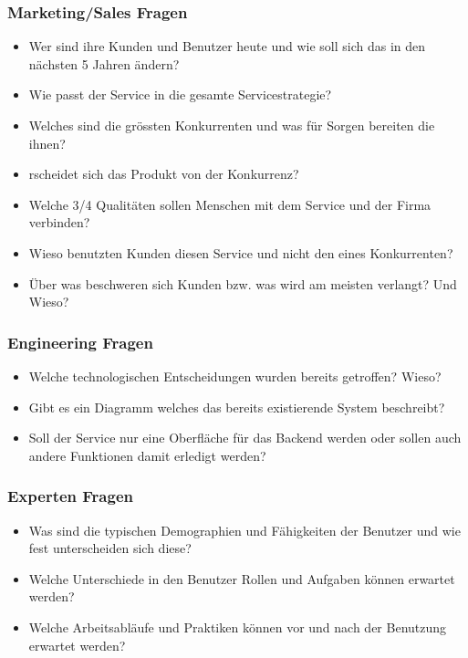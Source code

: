\subsubsection{Marketing/Sales Fragen}
\begin{itemize}
  \item Wer sind ihre Kunden und Benutzer heute und wie soll sich das in den nächsten 5 Jahren ändern?
  \item Wie passt der Service in die gesamte Servicestrategie?
  \item Welches sind die grössten Konkurrenten und was für Sorgen bereiten die ihnen?
  \item rscheidet sich das Produkt von der Konkurrenz?
  \item Welche 3/4 Qualitäten sollen Menschen mit dem Service und der Firma verbinden?
  \item Wieso benutzten Kunden diesen Service und nicht den eines Konkurrenten?
  \item Über was beschweren sich Kunden bzw. was wird am meisten verlangt? Und Wieso?
\end{itemize}

\subsubsection{Engineering Fragen}
\begin{itemize}
  \item Welche technologischen Entscheidungen wurden bereits getroffen? Wieso?
  \item Gibt es ein Diagramm welches das bereits existierende System beschreibt?
  \item Soll der Service nur eine Oberfläche für das Backend werden oder sollen auch andere Funktionen damit erledigt werden?
\end{itemize}


\subsubsection{Experten Fragen}
\begin{itemize}
  \item Was sind die typischen Demographien und Fähigkeiten der Benutzer und wie fest unterscheiden sich diese?
  \item Welche Unterschiede in den Benutzer Rollen und Aufgaben können erwartet werden?
  \item Welche Arbeitsabläufe und Praktiken können vor und nach der Benutzung erwartet  werden?
\end{itemize}


